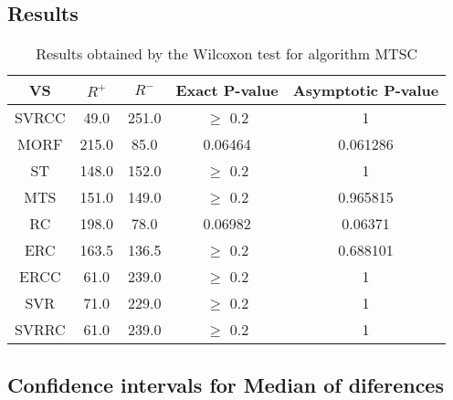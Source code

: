 \documentclass[a4paper,10pt]{article}
\begin{document}
\subsection{Results}

\begin{table}[!htp]
\centering\small
\begin{tabular}{
|c|c|c|c|c|}
\hline
 VS & $R^{+}$ & $R^{-}$ & Exact P-value & Asymptotic P-value \\ \hline 
SVRCC & 49.0 & 251.0 & $\geq$ 0.2 & 1\\ \hline 
MORF & 215.0 & 85.0 & 0.06464 & 0.061286\\ \hline 
ST & 148.0 & 152.0 & $\geq$ 0.2 & 1\\ \hline 
MTS & 151.0 & 149.0 & $\geq$ 0.2 & 0.965815\\ \hline 
RC & 198.0 & 78.0 & 0.06982 & 0.06371\\ \hline 
ERC & 163.5 & 136.5 & $\geq$ 0.2 & 0.688101\\ \hline 
ERCC & 61.0 & 239.0 & $\geq$ 0.2 & 1\\ \hline 
SVR & 71.0 & 229.0 & $\geq$ 0.2 & 1\\ \hline 
SVRRC & 61.0 & 239.0 & $\geq$ 0.2 & 1\\ \hline 

\end{tabular}
\caption{Results obtained by the Wilcoxon test for algorithm MTSC}
\end{table}

\subsection{Confidence intervals for Median of diferences}
\end{document}
